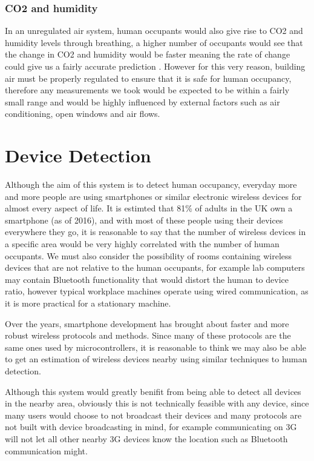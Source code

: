 \documentclass{l4proj}
\begin{document}
\subsubsection{CO2 and humidity}
In an unregulated air system, human occupants would also give rise to CO2 and humidity levels through breathing, a higher number of occupants would see that the change in CO2 and humidity would be faster meaning the rate of change could give us a fairly accurate prediction \cite{c-humid}. However for this very reason, building air must be properly regulated to ensure that it is safe for human occupancy, therefore any measurements we took would be expected to be within a fairly small range and would be highly influenced by external factors such as air conditioning, open windows and air flows.


\section{Device Detection}
Although the aim of this system is to detect human occupancy, everyday more and more people are using smartphones or similar electronic wireless devices for almost every aspect of life. It is estimted that 81\% of adults in the UK own a smartphone (as of 2016)\cite{c-phones}, and with most of these people using their devices everywhere they go, it is reasonable to say that the number of wireless devices in a specific area would be very highly correlated with the number of human occupants. We must also consider the possibility of rooms containing wireless devices that are not relative to the human occupants, for example lab computers may contain Bluetooth functionality that would distort the human to device ratio, however typical workplace machines operate using wired communication, as it is more practical for a stationary machine.

Over the years, smartphone development has brought about faster and more robust wireless protocols and methods. Since many of these protocols are the same ones used by microcontrollers, it is reasonable to think we may also be able to get an estimation of wireless devices nearby using similar techniques to human detection.

Although this system would greatly benifit from being able to detect all devices in the nearby area, obviously this is not technically feasible with any device, since many users would choose to not broadcast their devices and many protocols are not built with device broadcasting in mind, for example communicating on 3G will not let all other nearby 3G devices know the location such as Bluetooth communication might.
\end{document}
